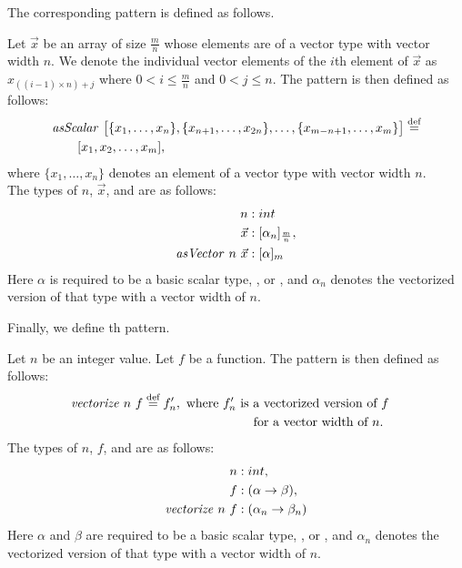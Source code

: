 \noindent
The corresponding \asScalar pattern is defined as follows.
\begin{definition}
  \label{definition:pattern:asScalar}
  Let $\vec{x}$ be an array of size $\frac{m}{n}$ whose elements are of a vector type with vector width $n$.
  We denote the individual vector elements of the $i$th element of $\vec{x}$ as $x_{((i-1)\times n)+j}$ where $0 < i \leq \frac{m}{n}$ and $0 < j \leq n$.
  The \asScalar pattern is then defined as follows:
  \begin{align*}
    &\text{\textit{asScalar}}\ \big[\{x_1, \ldots, x_n\}, \{x_{n+1}, \ldots, x_{2n}\}, \ldots, \{x_{m-n+1}, \ldots, x_m\}\big] \stackrel{\textrm{\scriptsize def}}{=}\\
    &\qquad [x_1, x_2, \dots, x_m],
  \end{align*}
  where $\{x_1,\ldots,x_n\}$ denotes an element of a vector type with vector width $n$.\\
  The types of $n$, $\vec{x}$, and \asVector are as follows:
  \begin{align*}
    n &: int\\
    \vec{x} &: [\alpha_n]_{\frac{m}{n}},\\
    \text{\textit{asVector}}\ n\ \vec{x} &: [\alpha]_m
  \end{align*}
  Here $\alpha$ is required to be a basic scalar type, \eg,  or , and $\alpha_n$ denotes the vectorized version of that type with a vector width of $n$.
\end{definition}

\noindent
Finally, we define th \vect pattern.
\begin{definition}
  \label{definition:pattern:vect}
  Let $n$ be an integer value.
  Let $f$ be a function.
  The \vect pattern is then defined as follows:
  \begin{align*}
    \text{\textit{vectorize}}\ n\ f &\stackrel{\textrm{\scriptsize def}}{=} f'_n, \begin{aligned}[t]
      \text{ where $f'_n$ is a vectorized version of $f$}\\
      \text{ for a vector width of $n$. }
    \end{aligned}
  \end{align*}
  The types of $n$, $f$, and \vect are as follows:
  \begin{align*}
    n &: int,\\
    f &: (\alpha \rightarrow \beta),\\
    \text{\textit{vectorize}}\ n\ f &: (\alpha_n \rightarrow \beta_n)
  \end{align*}
  Here $\alpha$ and $\beta$ are required to be a basic scalar type, \eg,  or , and $\alpha_n$ denotes the vectorized version of that type with a vector width of $n$.
\end{definition}

